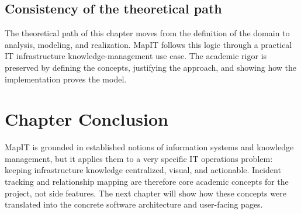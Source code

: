 \subsection{Consistency of the theoretical path}
The theoretical path of this chapter moves from the definition of the domain to analysis, modeling, and realization. MapIT follows this logic through a practical IT infrastructure knowledge-management use case. The academic rigor is preserved by defining the concepts, justifying the approach, and showing how the implementation proves the model.

\section{Chapter Conclusion}
MapIT is grounded in established notions of information systems and knowledge management, but it applies them to a very specific IT operations problem: keeping infrastructure knowledge centralized, visual, and actionable. Incident tracking and relationship mapping are therefore core academic concepts for the project, not side features. The next chapter will show how these concepts were translated into the concrete software architecture and user-facing pages.
